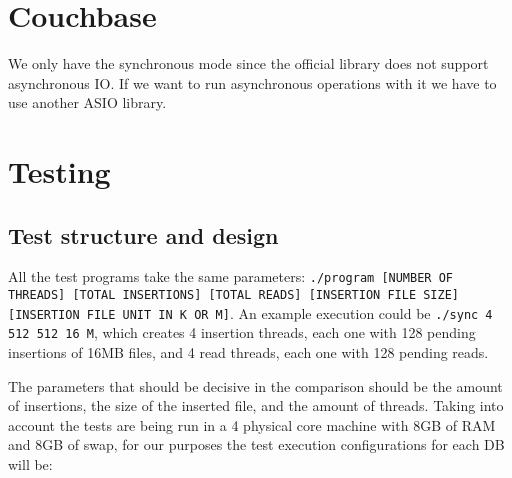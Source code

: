 \documentclass[11pt]{article}
\begin{document}
\section{Couchbase}
We only have the synchronous mode since the official library does not support asynchronous IO. If we want to run asynchronous operations with it we have to use another ASIO library.


\section{Testing}

\subsection{Test structure and design}
All the test programs take the same parameters: \texttt{./program [NUMBER OF THREADS] [TOTAL INSERTIONS] [TOTAL READS] [INSERTION FILE SIZE] [INSERTION FILE UNIT IN K OR M]}. An example execution could be \texttt{./sync 4 512 512 16 M}, which creates 4 insertion threads, each one with 128 pending insertions of 16MB files, and 4 read threads, each one with 128 pending reads.

The parameters that should be decisive in the comparison should be the amount of insertions, the size of the inserted file, and the amount of threads. Taking into account the tests are being run in a 4 physical core machine with 8GB of RAM and 8GB of swap, for our purposes the test execution configurations for each DB will be:
\end{document}
